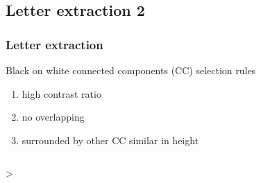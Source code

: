 \documentclass[9pt]{beamer}
\begin{document}
	\subsection[Letter2]{Letter extraction 2}
		\begin{frame}
		\frametitle{Letter extraction}

			\begin{block}{Black on white connected components (CC) selection rules}
				\begin{enumerate}
					\item high contrast ratio
					\item no overlapping
					\item surrounded by other CC similar in height
				\end{enumerate}

			\end{block}
		\begin{columns}[c]
			\column{15em}%
			  \vspace{1em}
			\column{15em} 
			  \vspace{1em}
		\end{columns}
		
>		\end{frame}
\end{document}
